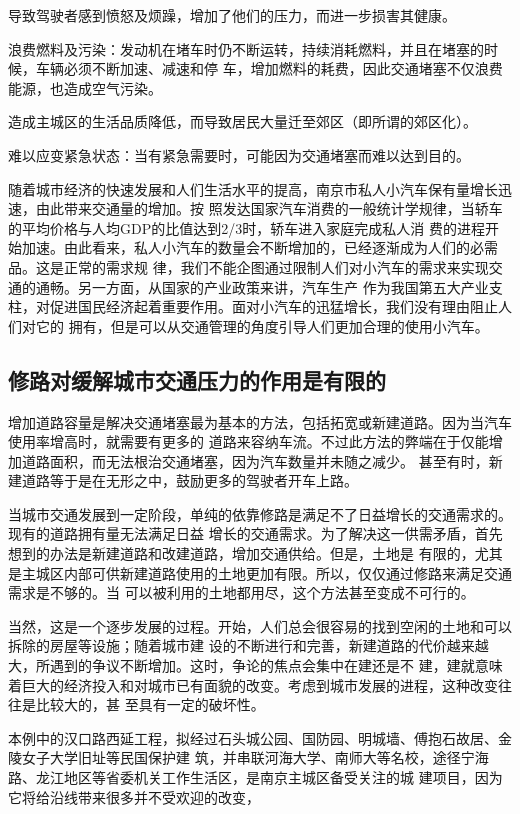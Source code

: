 ﻿\documentclass[11pt,a4paper,onecolumn]{article}
\begin{document}
导致驾驶者感到愤怒及烦躁，增加了他们的压力，而进一步损害其健康。

浪费燃料及污染：发动机在堵车时仍不断运转，持续消耗燃料，并且在堵塞的时候，车辆必须不断加速、减速和停
车，增加燃料的耗费，因此交通堵塞不仅浪费能源，也造成空气污染。

造成主城区的生活品质降低，而导致居民大量迁至郊区（即所谓的郊区化）。

难以应变紧急状态：当有紧急需要时，可能因为交通堵塞而难以达到目的。

随着城市经济的快速发展和人们生活水平的提高，南京市私人小汽车保有量增长迅速，由此带来交通量的增加。按
照发达国家汽车消费的一般统计学规律，当轿车的平均价格与人均GDP的比值达到2/3时，轿车进入家庭完成私人消
费的进程开始加速。由此看来，私人小汽车的数量会不断增加的，已经逐渐成为人们的必需品。这是正常的需求规
律，我们不能企图通过限制人们对小汽车的需求来实现交通的通畅。另一方面，从国家的产业政策来讲，汽车生产
作为我国第五大产业支柱，对促进国民经济起着重要作用。面对小汽车的迅猛增长，我们没有理由阻止人们对它的
拥有，但是可以从交通管理的角度引导人们更加合理的使用小汽车。

\subsection{修路对缓解城市交通压力的作用是有限的}

增加道路容量是解决交通堵塞最为基本的方法，包括拓宽或新建道路。因为当汽车使用率增高时，就需要有更多的
道路来容纳车流。不过此方法的弊端在于仅能增加道路面积，而无法根治交通堵塞，因为汽车数量并未随之减少。
甚至有时，新建道路等于是在无形之中，鼓励更多的驾驶者开车上路。

当城市交通发展到一定阶段，单纯的依靠修路是满足不了日益增长的交通需求的。现有的道路拥有量无法满足日益
增长的交通需求。为了解决这一供需矛盾，首先想到的办法是新建道路和改建道路，增加交通供给。但是，土地是
有限的，尤其是主城区内部可供新建道路使用的土地更加有限。所以，仅仅通过修路来满足交通需求是不够的。当
可以被利用的土地都用尽，这个方法甚至变成不可行的。

当然，这是一个逐步发展的过程。开始，人们总会很容易的找到空闲的土地和可以拆除的房屋等设施；随着城市建
设的不断进行和完善，新建道路的代价越来越大，所遇到的争议不断增加。这时，争论的焦点会集中在建还是不
建，建就意味着巨大的经济投入和对城市已有面貌的改变。考虑到城市发展的进程，这种改变往往是比较大的，甚
至具有一定的破坏性。

本例中的汉口路西延工程，拟经过石头城公园、国防园、明城墙、傅抱石故居、金陵女子大学旧址等民国保护建
筑，并串联河海大学、南师大等名校，途径宁海路、龙江地区等省委机关工作生活区，是南京主城区备受关注的城
建项目，因为它将给沿线带来很多并不受欢迎的改变，
\end{document}
